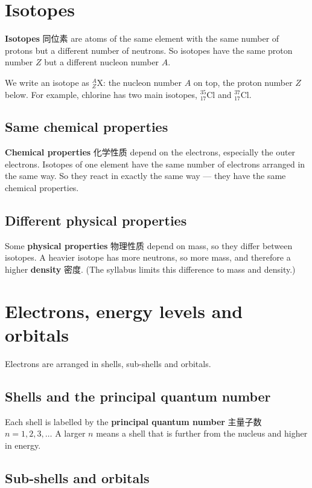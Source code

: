 \documentclass[11pt]{article}
\begin{document}
\section*{Isotopes}

\textbf{Isotopes} 同位素 are atoms of the same element with the same number of protons but a different number of neutrons. So isotopes have the same proton number $Z$ but a different nucleon number $A$.

We write an isotope as $^{A}_{Z}\text{X}$: the nucleon number $A$ on top, the proton number $Z$ below. For example, chlorine has two main isotopes, $^{35}_{17}\text{Cl}$ and $^{37}_{17}\text{Cl}$.

\subsection*{Same chemical properties}

\textbf{Chemical properties} 化学性质 depend on the electrons, especially the outer electrons. Isotopes of one element have the same number of electrons arranged in the same way. So they react in exactly the same way — they have the same chemical properties.

\subsection*{Different physical properties}

Some \textbf{physical properties} 物理性质 depend on mass, so they differ between isotopes. A heavier isotope has more neutrons, so more mass, and therefore a higher \textbf{density} 密度. (The syllabus limits this difference to mass and density.)

\section*{Electrons, energy levels and orbitals}

Electrons are arranged in shells, sub-shells and orbitals.

\subsection*{Shells and the principal quantum number}

Each shell is labelled by the \textbf{principal quantum number} 主量子数 $n = 1, 2, 3, \dots$ A larger $n$ means a shell that is further from the nucleus and higher in energy.

\subsection*{Sub-shells and orbitals}
\end{document}
